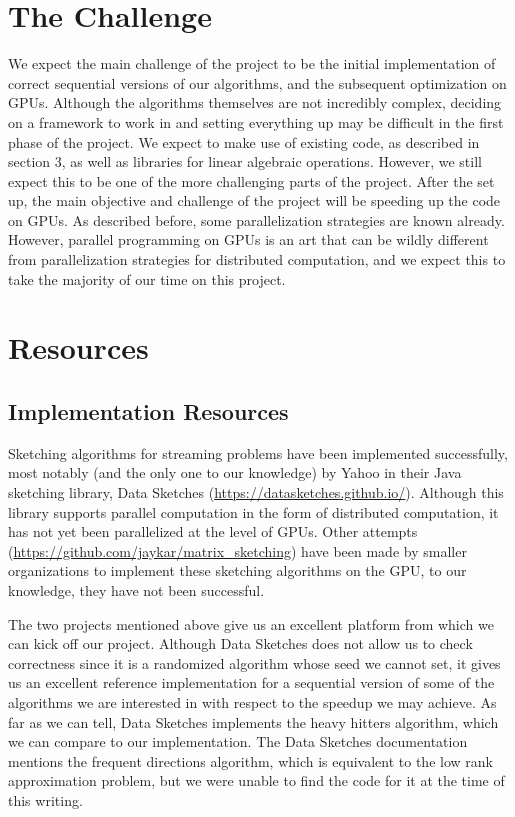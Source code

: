 \documentclass[12pt]{article}
\begin{document}
\section{The Challenge}
We expect the main challenge of the project to be the initial implementation of correct sequential versions of our algorithms, and the subsequent optimization on GPUs. Although the algorithms themselves are not incredibly complex, deciding on a framework to work in and setting everything up may be difficult in the first phase of the project. We expect to make use of existing code, as described in section 3, as well as libraries for linear algebraic operations. However, we still expect this to be one of the more challenging parts of the project. After the set up, the main objective and challenge of the project will be speeding up the code on GPUs. As described before, some parallelization strategies are known already. However, parallel programming on GPUs is an art that can be wildly different from parallelization strategies for distributed computation, and we expect this to take the majority of our time on this project.

\section{Resources}
\subsection{Implementation Resources}
Sketching algorithms for streaming problems have been implemented successfully, most notably (and the only one to our knowledge) by Yahoo in their Java sketching library, Data Sketches (\url{https://datasketches.github.io/}). Although this library supports parallel computation in the form of distributed computation, it has not yet been parallelized at the level of GPUs. Other attempts (\url{https://github.com/jaykar/matrix_sketching}) have been made by smaller organizations to implement these sketching algorithms on the GPU, to our knowledge, they have not been successful. 

The two projects mentioned above give us an excellent platform from which we can kick off our project. Although Data Sketches does not allow us to check correctness since it is a randomized algorithm whose seed we cannot set, it gives us an excellent reference implementation for a sequential version of some of the algorithms we are interested in with respect to the speedup we may achieve. As far as we can tell, Data Sketches implements the heavy hitters algorithm, which we can compare to our implementation. The Data Sketches documentation mentions the frequent directions algorithm, which is equivalent to the low rank approximation problem, but we were unable to find the code for it at the time of this writing. 
\end{document}
